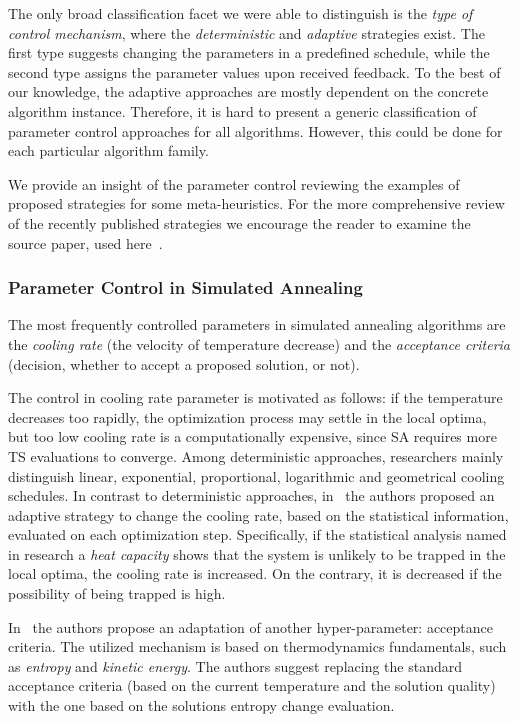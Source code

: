 The only broad classification facet we were able to distinguish is the \emph{type of control mechanism}, where the \emph{deterministic} and \emph{adaptive} strategies exist. The first type suggests changing the parameters in a predefined schedule, while the second type assigns the parameter values upon received feedback. To the best of our knowledge, the adaptive approaches are mostly dependent on the concrete algorithm instance. Therefore, it is hard to present a generic classification of parameter control approaches for all algorithms. However, this could be done for each particular algorithm family.

We provide an insight of the parameter control reviewing the examples of proposed strategies for some meta-heuristics. For the more comprehensive review of the recently published strategies we encourage the reader to examine the source paper, used here~\cite{huang2019survey}.


\subsubsection{Parameter Control in Simulated Annealing}\label{bg: parameter control: SA}
The most frequently controlled parameters in simulated annealing algorithms are the \emph{cooling rate} (the velocity of temperature decrease) and the \emph{acceptance criteria} (decision, whether to accept a proposed solution, or not).

The control in cooling rate parameter is motivated as follows: if the temperature decreases too rapidly, the optimization process may settle in the local optima, but too low cooling rate is a computationally expensive, since SA requires more TS evaluations to converge. Among deterministic approaches, researchers mainly distinguish linear, exponential, proportional, logarithmic and geometrical cooling schedules. In contrast to deterministic approaches, in~\cite{karabin2020simulated} the authors proposed an adaptive strategy to change the cooling rate, based on the statistical information, evaluated on each optimization step. Specifically, if the statistical analysis named in research a \emph{heat capacity} shows that the system is unlikely to be trapped in the local optima, the cooling rate is increased. On the contrary, it is decreased if the possibility of being trapped is high.

In~\cite{ghandeshtani2019entropy} the authors propose an adaptation of another hyper-parameter: acceptance criteria. The utilized mechanism is based on thermodynamics fundamentals, such as \emph{entropy} and \emph{kinetic energy}. The authors suggest replacing the standard acceptance criteria (based on the current temperature and the solution quality) with the one based on the solutions entropy change evaluation.

